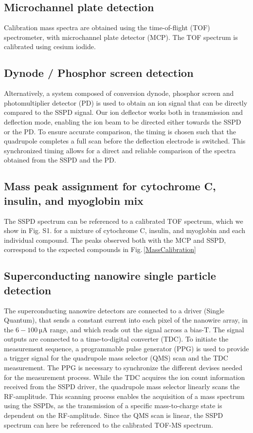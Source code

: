 \documentclass[12pt]{article}
\begin{document}
\subsection*{Microchannel plate detection}
Calibration mass spectra are obtained using the time-of-flight (TOF) spectrometer, with microchannel plate detector (MCP). The TOF spectrum is calibrated using cesium iodide. 

\subsection*{Dynode / Phosphor screen detection}
Alternatively, a system composed of conversion dynode, phosphor screen and photomultiplier detector (PD) is used to obtain an ion signal that can be directly compared to the SSPD signal. Our ion deflector works both in transmission and deflection mode, enabling the ion beam to be directed either towards the SSPD or the PD. To ensure accurate comparison, the timing is chosen such that the quadrupole completes a full scan before the deflection electrode is switched. This synchronized timing allows for a direct and reliable comparison of the spectra obtained from the SSPD and the PD.

\subsection*{Mass peak assignment for cytochrome C, insulin, and myoglobin mix}
The SSPD spectrum can be referenced to a calibrated TOF spectrum, which we show in Fig. S1. for a mixture of cytochrome C, insulin, and myoglobin and each individual compound. The peaks observed both with the MCP and SSPD, correspond to the expected compounds in Fig.\,\ref{MassCalibration}

\subsection*{Superconducting nanowire single particle detection}
The superconducting nanowire detectors are connected to a driver (Single Quantum), that sends a constant current into each pixel of the nanowire array, in the $6-100$\,µA range, and which reads out the signal across a bias-T. The signal outputs are connected to a time-to-digital converter (TDC). To initiate the measurement sequence, a programmable pulse generator (PPG) is used to provide a trigger signal for the quadrupole mass selector (QMS) scan and the TDC measurement. The PPG is necessary to synchronize the different devises needed for the measurement process. While the TDC acquires the ion count information received from the SSPD driver, the quadrupole mass selector linearly scans the RF-amplitude. This scanning process enables the acquisition of a mass spectrum using the SSPDs, as the transmission of a specific mass-to-charge state is dependent on the RF-amplitude. Since the QMS scan is linear, the SSPD spectrum can here be referenced to the calibrated TOF-MS spectrum. 
\end{document}
